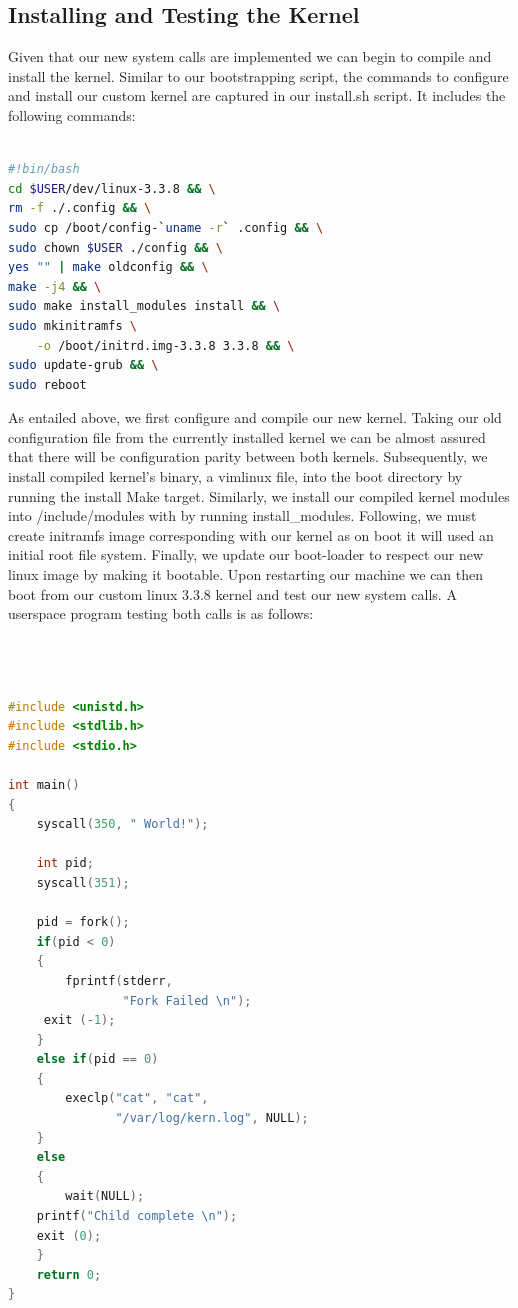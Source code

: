 \documentclass{article}
\begin{document}
\subsection{Installing and Testing the Kernel}
Given that our new system calls are implemented we can begin to compile and install the kernel.
Similar to our bootstrapping script, the commands to configure and install our custom kernel
are captured in our install\@.sh script. 
It includes the following commands: 
\begin{lstlisting}[language=Bash]

#!bin/bash
cd $USER/dev/linux-3.3.8 && \
rm -f ./.config && \
sudo cp /boot/config-`uname -r` .config && \
sudo chown $USER ./config && \
yes "" | make oldconfig && \
make -j4 && \
sudo make install_modules install && \
sudo mkinitramfs \
    -o /boot/initrd.img-3.3.8 3.3.8 && \
sudo update-grub && \
sudo reboot

\end{lstlisting}   
As entailed above, we first configure and compile our new kernel. Taking our
old configuration file from the currently installed kernel we can be almost 
assured that there will be configuration parity between both kernels. Subsequently,
we install compiled kernel's binary, a vimlinux file, into the boot directory 
by running the install Make target. Similarly, we install our compiled kernel modules 
into /include/modules with by running install\_modules. Following, we must
create initramfs image corresponding with our kernel as on boot 
it will used an initial root file system. Finally, we update our boot-loader to respect 
our new linux image by making it bootable. 
Upon restarting our machine we can then boot from our custom linux 3.3.8 kernel and test our 
new system calls. A userspace program testing both calls is as follows: 
\begin{lstlisting}[language=C]



#include <unistd.h>
#include <stdlib.h>
#include <stdio.h>

int main()
{
    syscall(350, " World!");
    
    int pid;
    syscall(351);

    pid = fork();	
    if(pid < 0)
    {
        fprintf(stderr, 
                "Fork Failed \n");
	 exit (-1);
    }
    else if(pid == 0)
    {
        execlp("cat", "cat", 
               "/var/log/kern.log", NULL);
    }
    else
    {
        wait(NULL);
	printf("Child complete \n");
	exit (0);
    }
    return 0;
}
\end{lstlisting} 
\end{document}
